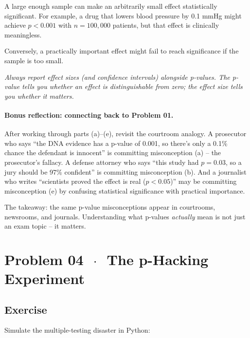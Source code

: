 \documentclass[11pt]{article}
\begin{document}
A large enough sample can make an arbitrarily small effect statistically significant. For example, a drug that lowers blood pressure by 0.1 mmHg might achieve $p < 0.001$ with $n = 100{,}000$ patients, but that effect is clinically meaningless.

Conversely, a practically important effect might fail to reach significance if the sample is too small.

\textit{Always report effect sizes (and confidence intervals) alongside p-values. The p-value tells you whether an effect is distinguishable from zero; the effect size tells you whether it matters.}

\paragraph{Bonus reflection: connecting back to Problem 01.}

After working through parts (a)--(e), revisit the courtroom analogy. A prosecutor who says ``the DNA evidence has a p-value of 0.001, so there's only a 0.1\% chance the defendant is innocent'' is committing misconception (a) -- the prosecutor's fallacy. A defense attorney who says ``this study had $p = 0.03$, so a jury should be 97\% confident'' is committing misconception (b). And a journalist who writes ``scientists proved the effect is real ($p < 0.05$)'' may be committing misconception (e) by confusing statistical significance with practical importance.

The takeaway: the same p-value misconceptions appear in courtrooms, newsrooms, and journals. Understanding what p-values \textit{actually} mean is not just an exam topic -- it matters.

\section*{Problem 04 \texorpdfstring{$\,\cdot\,$}{-} The p-Hacking Experiment}

\subsection*{Exercise}

Simulate the multiple-testing disaster in Python:
\end{document}
